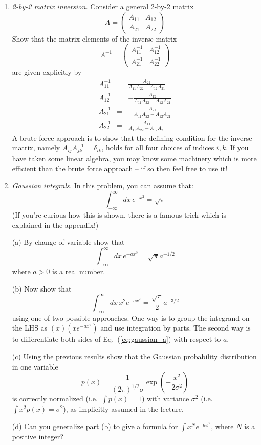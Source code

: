 \documentclass[aps,prd,superscriptaddress,groupedaddress,nofootinbib,nobibnotes]{revtex4}
\newcommand{\be}{\begin{equation}}
\newcommand{\ee}{\end{equation}}
\newcommand{\ba}{\begin{eqnarray}}
\newcommand{\ea}{\end{eqnarray}}
\newcommand{\nn}{\nonumber}
\begin{document}
\begin{enumerate}
\item {\em 2-by-2 matrix inversion.} 
Consider a general 2-by-2 matrix
\be
A = \left( \begin{array}{cc}
  A_{11} & A_{12} \\
  A_{21} & A_{22}
\end{array} \right)
\ee
Show that the matrix elements of the inverse matrix
\be
A^{-1} = \left( \begin{array}{cc}
  A^{-1}_{11} & A^{-1}_{12} \\
  A^{-1}_{21} & A^{-1}_{22}
\end{array} \right)
\ee
are given explicitly by
\ba
A^{-1}_{11} &=& \frac{A_{22}}{A_{11}A_{22} - A_{12} A_{21}} \nn \\
A^{-1}_{12} &=& -\frac{A_{12}}{A_{11}A_{22} - A_{12} A_{21}} \nn \\
A^{-1}_{21} &=& -\frac{A_{21}}{A_{11}A_{22} - A_{12} A_{21}} \nn \\
A^{-1}_{22} &=& \frac{A_{11}}{A_{11}A_{22} - A_{12} A_{21}}
\ea
A brute force approach is to show that the defining condition for the inverse matrix,
namely $A_{ij} A^{-1}_{jk} = \delta_{ik}$, holds for all four choices of indices $i,k$.
If you have taken some linear algebra, you may know some machinery which is more efficient
than the brute force approach -- if so then feel free to use it!

\item {\em Gaussian integrals.} In this problem, you can assume that:
\be
\int_{-\infty}^\infty dx \, e^{-x^2} = \sqrt{\pi}
\ee
(If you're curious how this is shown, there is a famous trick which is explained in the appendix!)
\par\medskip
(a) By change of variable show that
\be
\int_{-\infty}^\infty dx \, e^{-ax^2} = \sqrt{\pi} a^{-1/2}  \label{eq:gaussian_a}
\ee
where $a > 0$ is a real number.
\par\medskip
(b) Now show that 
\be
\int_{-\infty}^\infty dx \, x^2 e^{-ax^2} = \frac{\sqrt{\pi}}{2} a^{-3/2}   \label{eq:gaussian_a2}
\ee
using one of two possible approaches.  One way is to group the integrand on the LHS as $(x) (x e^{-ax^2})$
and use integration by parts.  The second way is to differentiate both sides of Eq.~(\ref{eq:gaussian_a})
with respect to $a$.
\par\medskip
(c) Using the previous results show that the Gaussian probability distribution in one variable
\be
p(x) = \frac{1}{(2\pi)^{1/2} \sigma} \exp\left( - \frac{x^2}{2\sigma^2} \right)
\ee
is correctly normalized (i.e.~$\int p(x) = 1$) with variance $\sigma^2$ 
(i.e.~$\int x^2 p(x) = \sigma^2$), as implicitly assumed in the lecture.
\par\medskip
(d) Can you generalize part (b) to give a formula for $\int x^N e^{-ax^2}$, where $N$ is a positive integer?

\end{enumerate}
\end{document}

